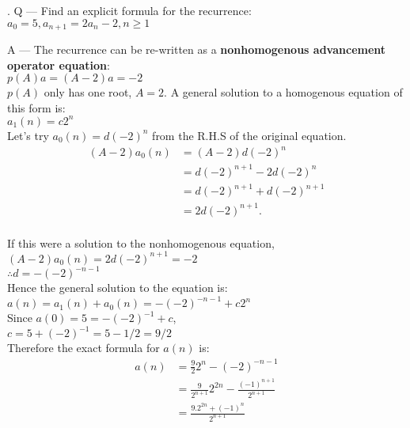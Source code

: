 \documentclass{article}
\newcounter{question}
\begin{document}
\newcommand\Que[1]{%
   \leavevmode\par
   \stepcounter{question}
   \noindent
   \thequestion. Q --- #1\par}

\newcommand\Ans[2][]{%
    \leavevmode\par\noindent
   {\leftskip37pt
    A --- \textbf{#1}#2\par}}

\Que{
    Find an explicit formula for the recurrence:\\

    $a_0=5, a_{n+1}=2a_{n}-2, n\ge1$
    }
\Ans{
    The recurrence can be re-written as a 
    \textbf{nonhomogenous advancement operator equation}:\\

    $p(A)a = (A-2)a = -2$\\

    $p(A)$ only has one root, $A=2$. 
    A general solution to a homogenous equation of this
    form is:\\

    $a_1(n) = c{2}^n$\\

    Let's try $a_0(n) = d(-2)^n$ from the R.H.S of the original equation.\\

    \begin{align*}
        (A-2)a_0(n) & = (A-2)d(-2)^n\\
        & = d(-2)^{n+1} - 2d(-2)^n\\
        & = d(-2)^{n+1} + d(-2)^{n+1}\\
        & = 2d(-2)^{n+1}.\\
    \end{align*}

    If this were a solution to the nonhomogenous
    equation,\\
    
    $(A-2)a_0(n) = 2d(-2)^{n+1} = -2$\\
    
    $\therefore d = -(-2)^{-n-1}$\\

    Hence the general solution to the equation is:\\

    $a(n) = a_1(n)+a_0(n) = -(-2)^{-n-1} + c2^n$\\

    Since $a(0) = 5 = -(-2)^{-1} + c$,\\

    $c = 5 + (-2)^{-1} = 5 - 1/2 = 9/2$\\

    Therefore the exact formula for $a(n)$ is:\\

    \begin{align*}
        a(n) & = \frac{9}{2}2^{n} - (-2)^{-n-1}\\
        & = \frac{9}{2^{n+1}}2^{2n} - \frac{(-1)^{n+1}}{2^{n+1}}\\
        & = \boxed{\frac{9.2^{2n} + (-1)^n}{2^{n+1}}}\\
    \end{align*}
    }
\end{document}
